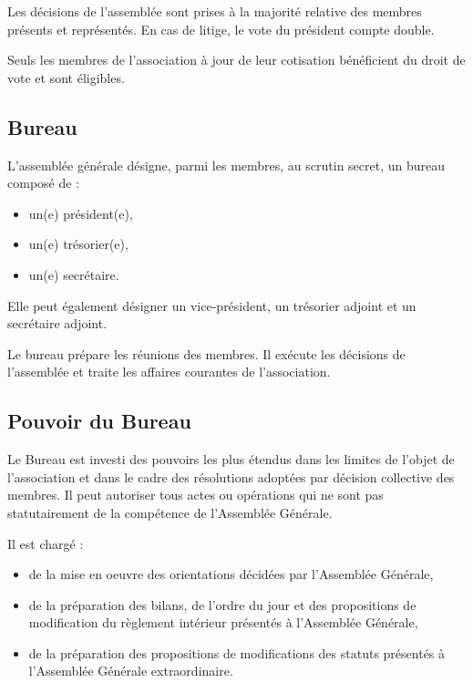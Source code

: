 \documentclass[a4paper,french,10pt]{article}
\begin{document}
Les décisions de l’assemblée sont prises à la majorité relative des
membres présents et représentés. En cas de litige, le vote du
président compte double.

Seuls les membres de l’association à jour de leur cotisation
bénéficient du droit de vote et sont éligibles.





\subsection{Bureau}
\label{sec:bureau}
L’assemblée générale désigne, parmi les membres, au scrutin secret, un
bureau composé de :
\begin{itemize}
\item un(e) président(e),
  
\item un(e) trésorier(e),

\item un(e) secrétaire.
\end{itemize}

Elle peut également désigner un vice-président, un trésorier adjoint
et un secrétaire adjoint.

Le bureau prépare les réunions des membres. Il exécute les décisions de l’assemblée et traite les affaires courantes de l’association.

\subsection{Pouvoir du Bureau}
\label{sec:pouvoirs}
Le Bureau est investi des pouvoirs les plus étendus dans les limites
de l’objet de l’association et dans le cadre des résolutions adoptées
par décision collective des membres. Il peut autoriser tous actes ou
opérations qui ne sont pas statutairement de la compétence de
l’Assemblée Générale.

Il est chargé :
\begin{itemize}
\item de la mise en oeuvre des orientations décidées par l'Assemblée
  Générale,

  \item de la préparation des bilans, de l'ordre du jour et des
  propositions de modification du règlement intérieur présentés à
  l'Assemblée Générale,

  \item de la préparation des propositions de modifications des statuts
  présentés à l'Assemblée Générale extraordinaire.
\end{itemize}
\end{document}
